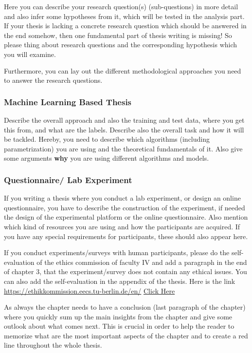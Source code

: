 Here you can describe your research question(s) (sub-questions) in more detail and also infer some hypotheses from it, which will be tested in the analysis part. If your thesis is lacking a concrete research question which should be answered in the end somehow, then one fundamental part of thesis writing is missing! So please thing about research questions and the corresponding hypothesis which you will examine. 

Furthermore, you can lay out the different methodological approaches you need to answer the research questions. 

\subsubsection{Machine Learning Based Thesis}
Describe the overall approach and also the training and test data, where you get this from, and what are the labels. Describe also the overall task and how it will be tackled. Hereby, you need to describe which algorithms (including parametrization) you are using and the theoretical fundamentals of it. Also give some arguments \textbf{why} you are using different algorithms and models. 

\subsubsection{Questionnaire/ Lab Experiment}
If you writing a thesis where you conduct a lab experiment, or design an online questionnaire, you have to describe the construction of the experiment, if needed the design of the experimental platform or the online questionnaire. Also mention which kind of resources you are using and how the participants are acquired. If you have any special requirements for participants, these should also appear here. 

If you conduct experiments/surveys with human participants, please do the self-evaluation of the ethics commission of faculty IV and add a paragraph in the end of chapter 3, that the experiment/survey does not contain any ethical issues. You can also add the self-evaluation in the appendix of the thesis. Here is the link \url{https://ethikkommission.eecs.tu-berlin.de/en/} \href{https://ethikkommission.eecs.tu-berlin.de/en/}{Click Here}

As always the chapter needs to have a conclusion (last paragraph of the chapter) where you quickly sum up the main insights from the chapter and give some outlook about what comes next. This is crucial in order to help the reader to memorize what are the most important aspects of the chapter and to create a red line throughout the whole thesis. 